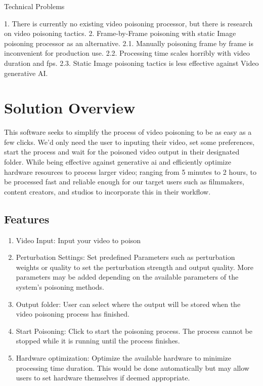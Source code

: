 Technical Problems

1. There is currently no existing video poisoning processor, but there is research on video poisoning tactics.
2. Frame-by-Frame poisoning with static Image poisoning processor as an alternative.
    2.1. Manually poisoning frame by frame is inconvenient for production use.
    2.2. Processing time scales horribly with video duration and fps.
    2.3. Static Image poisoning tactics is less effective against Video generative AI.

\section{Solution Overview}
\label{section:solution-overview}

This software seeks to simplify the process of video poisoning to be as easy as a few clicks.
We'd only need the user to inputing their video, set some preferences, start the process and wait for the poisoned video output in their designated folder.
While being effective against generative ai and efficiently optimize hardware resources to process larger video; ranging from 5 minutes to 2 hours, to be processed fast and reliable enough for our target users such as filmmakers, content creators, and studios to incorporate this in their workflow. 

\subsection{Features}
\label{subsection:features}

\begin{enumerate}[leftmargin=80pt]
    \item Video Input: Input your video to poison
    \item Perturbation Settings: Set predefined Parameters such as perturbation weights or quality to set the perturbation strength and output quality. More parameters may be added depending on the available parameters of the system's poisoning methods.
    \item Output folder: User can select where the output will be stored when the video poisoning process has finished.
    \item Start Poisoning: Click to start the poisoning process. The process cannot be stopped while it is running until the process finishes.
    \item Hardware optimization: Optimize the available hardware to minimize processing time duration. This would be done automatically but may allow users to set hardware themselves if deemed appropriate.
\end{enumerate}

